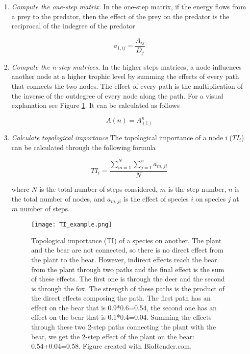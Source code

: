 \begin{enumerate}

  \item \emph{Compute the one-step matrix.} \smallskip \newline
  In the one-step matrix, if the energy flows from a prey to the predator, then the effect of the prey on the predator is the reciprocal of the indegree of the predator

            \begin{equation}
              a_{1,ij}=\frac{A_{ij}}{D_j}
            \end{equation}

  \item \emph{Compute the n-step matrices.} \smallskip \newline
  In the higher steps matrices, a node influences another node at a higher trophic level by summing the effects of every path that connects the two nodes. The effect of every path is the multiplication of the inverse of the outdegree of every node along the path. For a visual explanation see Figure \ref{fig:TI}. It can be calculated as follows

            \begin{equation}
              A\left(n\right)=A_{\left(1\right)}^n
            \end{equation}

  \item \emph{Calculate topological importance} \smallskip \newline
  The topological importance of a node i ($TI_i$) can be calculated through the following formula

            \begin{equation}
              TI_i=\frac{\sum\limits^N_{m=1}\sum\limits^n_{j=1}a_{m,ji}}{N}
            \end{equation}

  \noindent where $N$ is the total number of steps considered, $m$ is the step number,  $n$ is the total number of nodes, and $a_{m,ji}$ is the effect of species $i$ on species $j$ at $m$ number of steps.

            \begin{figure}[htbp]%
              \centering
              \texttt{[image: TI\_example.png]}
              \caption{Topological importance (TI) of a species on another. The plant and the bear are not connected, so there is no direct effect from the plant to the bear. However, indirect effects reach the bear from the plant through two paths and the final effect is the sum of these effects. The first one is through the deer and the second is through the fox. The strength of these paths is the product of the direct effects composing the path. The first path has an effect on the bear that is 0.9*0.6=0.54, the second one has an effect on the bear that is 0.1*0.4=0.04. Summing the effects through these two 2-step paths connecting the plant with the bear, we get the 2-step effect of the plant on the bear: 0.54+0.04=0.58. Figure created with BioRender.com.} \label{fig:TI}
            \end{figure}

\end{enumerate}
